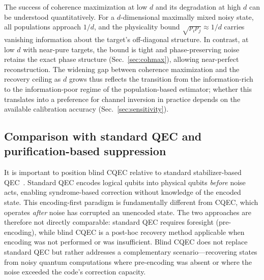 \documentclass[pra,twocolumn,superscriptaddress,longbibliography,floatfix,nofootinbib]{revtex4-2}
\begin{document}
The success of coherence maximization at low $d$ and its degradation at high $d$ can be understood quantitatively.
For a $d$-dimensional maximally mixed noisy state, all populations approach $1/d$, and the physicality bound $\sqrt{p_i p_j} \approx 1/d$ carries vanishing information about the target's off-diagonal structure.
In contrast, at low $d$ with near-pure targets, the bound is tight and phase-preserving noise retains the exact phase structure (Sec.~\ref{sec:cohmax}), allowing near-perfect reconstruction.
The widening gap between coherence maximization and the recovery ceiling as $d$ grows thus reflects the transition from the information-rich to the information-poor regime of the population-based estimator; whether this translates into a preference for channel inversion in practice depends on the available calibration accuracy (Sec.~\ref{sec:sensitivity}).


\subsection{Comparison with standard QEC and purification-based suppression}
\label{sec:pqec}

It is important to position blind CQEC relative to standard stabilizer-based QEC~\cite{Shor1995,Gottesman1997}.
Standard QEC encodes logical qubits into physical qubits \emph{before} noise acts, enabling syndrome-based correction without knowledge of the encoded state.
This encoding-first paradigm is fundamentally different from CQEC, which operates \emph{after} noise has corrupted an unencoded state.
The two approaches are therefore not directly comparable: standard QEC requires foresight (pre-encoding), while blind CQEC is a post-hoc recovery method applicable when encoding was not performed or was insufficient.
Blind CQEC does not replace standard QEC but rather addresses a complementary scenario---recovering states from noisy quantum computations where pre-encoding was absent or where the noise exceeded the code's correction capacity.
\end{document}
